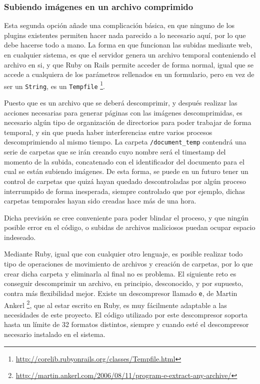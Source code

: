 
\subsubsection{Subiendo imágenes en un archivo comprimido} %
\label{ssub:subiendo_imágenes_en_un_archivo_comprimido}

Esta segunda opción añade una complicación básica, en que ninguno de los plugins existentes permiten hacer nada parecido a lo necesario aquí, por lo que debe hacerse todo a mano. La forma en que funcionan las subidas mediante web, en cualquier sistema, es que el servidor genera un archivo temporal conteniendo el archivo en si, y que Ruby on Rails permite acceder de forma normal, igual que se accede a cualquiera de los parámetros rellenados en un formulario, pero en vez de ser un \texttt{String}, es un \texttt{Tempfile} \footnote{\url{http://corelib.rubyonrails.org/classes/Tempfile.html}}. 

Puesto que es un archivo que se deberá descomprimir, y después realizar las acciones necesarias para generar páginas con las imágenes descomprimidas, es necesario algún tipo de organización de directorios para poder trabajar de forma temporal, y sin que pueda haber interferencias entre varios procesos descomprimiendo al mismo tiempo. La carpeta \texttt{/document\_temp} contendrá una serie de carpetas que se irán creando cuyo nombre será el timestamp del momento de la subida, concatenado con el identificador del documento para el cual se están subiendo imágenes. De esta forma, se puede en un futuro tener un control de carpetas que quizá hayan quedado descontroladas por algún proceso interrumpido de forma inesperada, siempre controlado que por ejemplo, dichas carpetas temporales hayan sido creadas hace más de una hora.

Dicha previsión se cree conveniente para poder blindar el proceso, y que ningún posible error en el código, o subidas de archivos maliciosos puedan ocupar espacio indeseado.

Mediante Ruby, igual que con cualquier otro lenguaje, es posible realizar todo tipo de operaciones de movimiento de archivos y creación de carpetas, por lo que crear dicha carpeta y eliminarla al final no es problema. El siguiente reto es conseguir descomprimir un archivo, en principio, desconocido, y por supuesto, contra más flexibilidad mejor. Existe un descompresor llamado \texttt{e}, de Martin Ankerl \footnote{\url{http://martin.ankerl.com/2006/08/11/program-e-extract-any-archive/}}, que al estar escrito en Ruby, es muy fácilmente adaptable a las necesidades de este proyecto. El código utilizado por este descompresor soporta hasta un límite de 32 formatos distintos, siempre y cuando esté el descompresor necesario instalado en el sistema.

